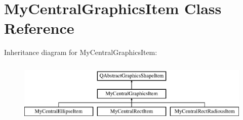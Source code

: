 \hypertarget{class_my_central_graphics_item}{}\section{My\+Central\+Graphics\+Item Class Reference}
\label{class_my_central_graphics_item}
Inheritance diagram for My\+Central\+Graphics\+Item\+:\begin{figure}[H]
\begin{center}
\leavevmode
\includegraphics[height=3.000000cm]{class_my_central_graphics_item}
\end{center}
\end{figure}
